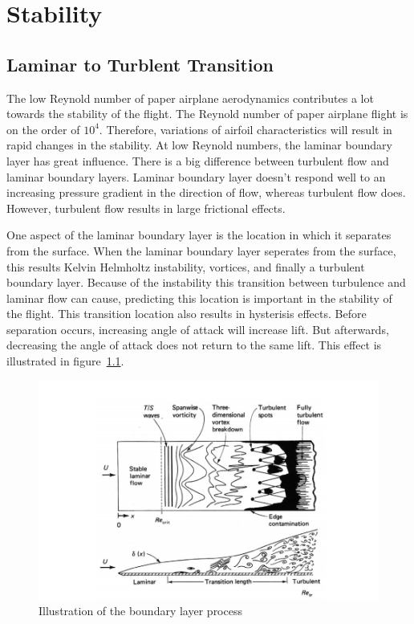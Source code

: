 
\chapter{Stability}

\section{Laminar to Turblent Transition}

The low Reynold number of paper airplane aerodynamics contributes a lot towards the
stability of the flight.
The Reynold number of paper airplane flight is on the order of $10^4$.
Therefore, variations of airfoil characteristics will result in rapid changes in 
the stability. At low Reynold numbers, the laminar boundary layer has great 
influence. There is a big difference between turbulent flow and laminar boundary
layers. Laminar boundary layer doesn't respond well to an increasing
pressure gradient in the direction of flow, whereas turbulent flow does.
However, turbulent flow results in large frictional effects.

One aspect of the laminar boundary layer is the location in which it separates from the surface.
When the laminar boundary layer seperates from the surface, this results Kelvin
Helmholtz instability, vortices, and finally a turbulent boundary layer. 
Because of the instability this transition between turbulence and laminar flow 
can cause, predicting this location is important in the stability of the flight.
This transition location also results in hysterisis effects. Before separation
occurs, increasing angle of attack will increase lift. But afterwards,
decreasing the angle of attack does not return to the same lift. This effect is
illustrated in figure~\ref{fig:boundary_layer_transition}.

\begin{figure}[hl]
  \centering
    \includegraphics[scale=.5]{figures/boundary_layer_transition.png}
    \caption{Illustration of the boundary layer process}
  \label{fig:boundary_layer_transition}
\end{figure}



